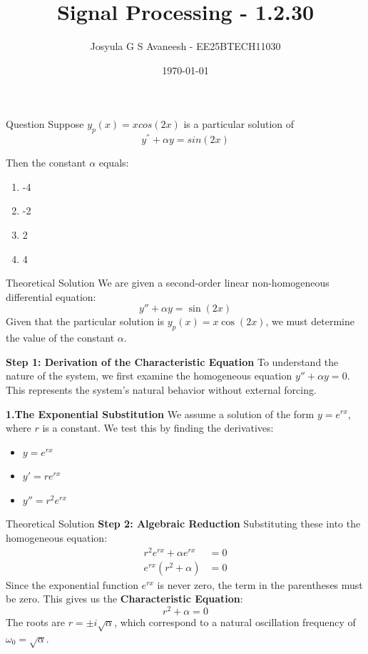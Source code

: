 \documentclass{beamer}
\title %
{Signal Processing - 1.2.30}
\date\today
\author 
{Josyula G S Avaneesh - EE25BTECH11030}
\begin{document}
\frame{\titlepage}
\begin{frame}{Question}
Suppose $y_p(x)=xcos(2x)$ is a particular solution of 
$$y^{''} + \alpha y=sin(2x)$$

Then the constant $\alpha$ equals:
\begin{enumerate}
    \item -4
    \item -2
    \item 2
    \item 4
\end{enumerate}
\end{frame}



\begin{frame}{Theoretical Solution}
We are given a second-order linear non-homogeneous differential equation:
\begin{equation}
    y'' + \alpha y = \sin(2x)
\end{equation}
Given that the particular solution is $y_p(x) = x\cos(2x)$, we must determine the value of the constant $\alpha$.

\textbf{Step 1: Derivation of the Characteristic Equation}
To understand the nature of the system, we first examine the homogeneous equation $y'' + \alpha y = 0$. This represents the system's natural behavior without external forcing.

\textbf{1.The Exponential Substitution}
We assume a solution of the form $y = e^{rx}$, where $r$ is a constant. We test this by finding the derivatives:
\begin{itemize}
    \item $y = e^{rx}$
    \item $y' = r e^{rx}$
    \item $y'' = r^2 e^{rx}$
\end{itemize}

\end{frame}

\begin{frame}{Theoretical Solution}
\textbf{Step 2: Algebraic Reduction}
Substituting these into the homogeneous equation:
\begin{align*}
    r^2 e^{rx} + \alpha e^{rx} &= 0 \\
    e^{rx}(r^2 + \alpha) &= 0
\end{align*}
Since the exponential function $e^{rx}$ is never zero, the term in the parentheses must be zero. This gives us the \textbf{Characteristic Equation}:
\begin{equation}
    r^2 + \alpha = 0
\end{equation}
The roots are $r = \pm i\sqrt{\alpha}$, which correspond to a natural oscillation frequency of $\omega_0 = \sqrt{\alpha}$.

\end{frame}
\end{document}
